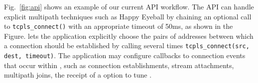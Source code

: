 Fig.~\ref{fig:api} shows an example of our current API workflow. The API can
handle explicit multipath techniques such as Happy Eyeball by chaining an optional call to \texttt{tcpls\_connect()} with an appropriate timeout of 50ms, as shown in the
Figure. \tcpls lets the application explicitly choose the pairs of addresses
between which a \tcp connection should be established by calling several times
\texttt{tcpls\_connect(src, dest, timeout)}. The application may configure
callbacks to connection events that occur within \tcpls, such as connection
establishments, stream attachments, multipath joins, the receipt of a \tcp
option to tune \tcp.







